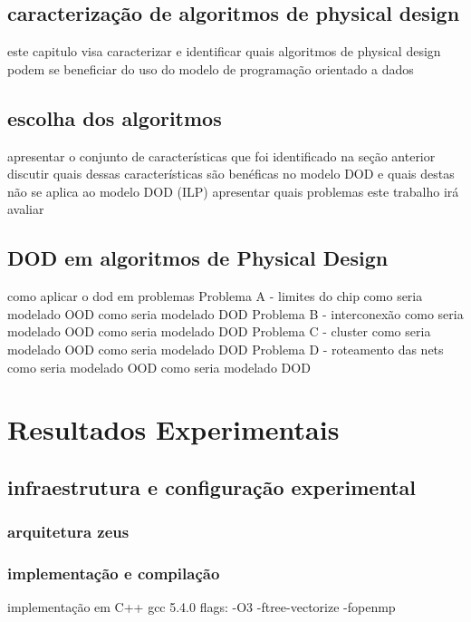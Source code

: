 \section{caracterização de algoritmos de physical design}
    este capitulo visa caracterizar e identificar quais algoritmos de physical design podem se beneficiar do uso do modelo de programação orientado a dados

    \section{escolha dos algoritmos}      
        apresentar o conjunto de características que foi identificado na seção anterior
        discutir quais dessas características são benéficas no modelo DOD e quais destas não se aplica ao modelo DOD (ILP)
        apresentar quais problemas este trabalho irá avaliar

    \section{DOD em algoritmos de Physical Design}
    como aplicar o dod em problemas
        Problema A - limites do chip
            como seria modelado OOD
            como seria modelado DOD
        Problema B - interconexão
            como seria modelado OOD
            como seria modelado DOD
        Problema C - cluster
            como seria modelado OOD
            como seria modelado DOD
        Problema D - roteamento das nets
            como seria modelado OOD
            como seria modelado DOD


\chapter{Resultados Experimentais}
    \section{infraestrutura e configuração experimental}
        \subsection{arquitetura zeus}
        \subsection{implementação e compilação}
            implementação em C++
            gcc 5.4.0
            flags: -O3 -ftree-vectorize -fopenmp
            
